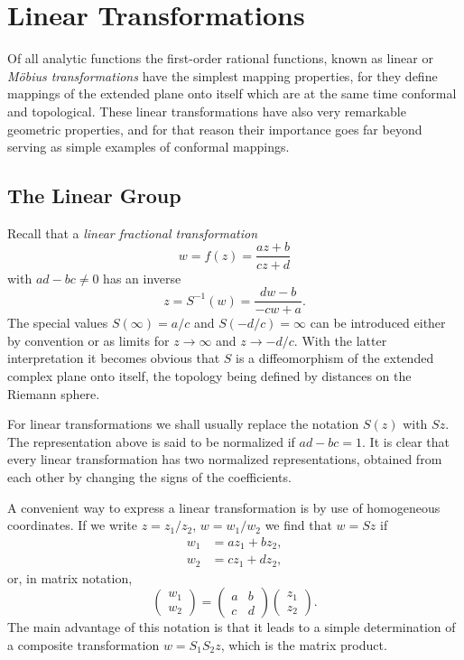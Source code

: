 \chapter{Linear Transformations}
\label{chap:linear-transformations}

Of all analytic functions the first-order rational functions, known as linear or \emph{Möbius transformations} have the simplest mapping properties, for they define mappings of the extended plane onto itself which are at the same time conformal and topological. These linear transformations have also very remarkable geometric properties, and for that reason their importance goes far beyond serving as simple examples of conformal mappings.

\section{The Linear Group}
Recall that a \emph{linear fractional transformation} $$w=f(z)=\dfrac{az+b}{cz+d}$$ with $ad-bc \neq 0$ has an inverse $$z=S^{-1}(w)=\dfrac{dw-b}{-cw+a}.$$ The special values $S(\infty)=a/c$ and $S(-d/c)=\infty$ can be introduced either by convention or as limits for $z \rightarrow \infty$ and $z \rightarrow -d/c$. With the latter interpretation it becomes obvious that $S$ is a diffeomorphism of the extended complex plane onto itself, the topology being defined by distances on the Riemann sphere.

For linear transformations we shall usually replace the notation $S(z)$ with $Sz$. The representation above is said to be normalized if $ad-bc=1$. It is clear that every linear transformation has two normalized representations, obtained from each other by changing the signs of the coefficients.

A convenient way to express a linear transformation is by use of homogeneous coordinates. If we write $z=z_1/z_2$, $w=w_1/w_2$ we find that $w=Sz$ if
\begin{align*}
	w_1 &=az_1+bz_2, \\
	w_2 &=cz_1+dz_2,
\end{align*}
or, in matrix notation, $$\begin{pmatrix}
	w_1 \\
	w_2
\end{pmatrix}=\begin{pmatrix}
a & b \\
c & d
\end{pmatrix}\begin{pmatrix}
z_1 \\
z_2
\end{pmatrix}.$$ The main advantage of this notation is that it leads to a simple determination of a composite transformation $w=S_1S_2z$, which is the matrix product.


